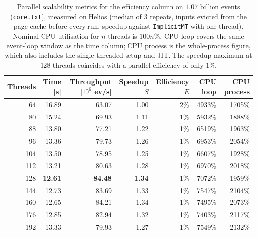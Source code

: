 \begin{table}[htbp]
\centering
\caption{Parallel scalability metrics for the efficiency column on $1.07$ billion events (\texttt{core.txt}), measured on Helios (median of 3 repeats, inputs evicted from the page cache before every run, speedup against \texttt{ImplicitMT} with one thread). Nominal CPU utilisation for $n$ threads is $100n\%$. CPU loop covers the same event-loop window as the time column; CPU process is the whole-process figure, which also includes the single-threaded setup and JIT. The speedup maximum at 128 threads coincides with a parallel efficiency of only $1\%$.}
\label{tab:scalability-efficiency}
\begin{tabular}{rrrrrrr}
\toprule
Threads & Time [s] & Throughput [$10^6$ ev/s] & Speedup $S$ & Efficiency $E$ & CPU loop & CPU process \\
\midrule
64 & 16.89 & 63.07 & 1.00 & 2\% & 4933\% & 1705\% \\
80 & 15.24 & 69.93 & 1.11 & 1\% & 5932\% & 1888\% \\
88 & 13.80 & 77.21 & 1.22 & 1\% & 6519\% & 1963\% \\
96 & 13.36 & 79.73 & 1.26 & 1\% & 6953\% & 2054\% \\
104 & 13.50 & 78.95 & 1.25 & 1\% & 6607\% & 1928\% \\
112 & 13.21 & 80.63 & 1.28 & 1\% & 6970\% & 2018\% \\
128 & \textbf{12.61} & \textbf{84.48} & \textbf{1.34} & 1\% & 7072\% & 1959\% \\
144 & 12.73 & 83.69 & 1.33 & 1\% & 7547\% & 2104\% \\
160 & 12.65 & 84.21 & 1.34 & 1\% & 7495\% & 2073\% \\
176 & 12.85 & 82.94 & 1.32 & 1\% & 7403\% & 2117\% \\
192 & 13.33 & 79.93 & 1.27 & 1\% & 7549\% & 2132\% \\
\bottomrule
\end{tabular}
\end{table}
